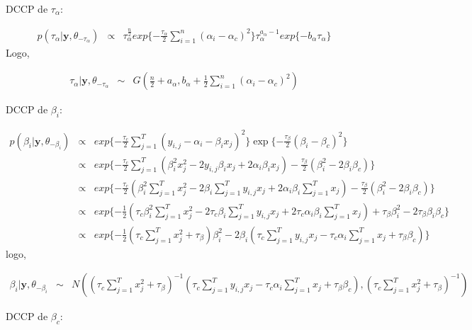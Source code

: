 \documentclass[12pt,a4paper,header]{abnt}
\def\bs{\boldsymbol}
\begin{document}
\ac{DCCP} de $\tau_\alpha$:

\begin{eqnarray}
p(\tau_\alpha | \bs{y}, \theta_{-\tau_\alpha} ) &\propto& \tau_\alpha^\frac{n}{2} exp\{ - \frac{\tau_\alpha}{2}  \sum^n_{i=1} (\alpha_{i} -\alpha_c)^2 \}  \tau_\alpha^{a_\alpha - 1} exp\{ -b_\alpha \tau_\alpha \}
\end{eqnarray}
Logo,

\begin{eqnarray}
\tau_\alpha | \bs{y}, \theta_{-\tau_\alpha}  &\sim& G(\frac{n}{2}+a_\alpha , b_\alpha + \frac{1}{2}\sum^n_{i=1} (\alpha_i -\alpha_c)^2 )
\end{eqnarray}

\ac{DCCP} de $\beta_i$:

\begin{eqnarray}
p(\beta_i | \bs{y}, \theta_{-\beta_i}) &\propto& exp\{ -\frac{\tau_c}{2} \sum^T_{j=1} (y_{i,j} -\alpha_i-  \beta_ix_j)^2  \} \exp\{ - \frac{\tau_\beta}{2} (\beta_i-\beta_c)^2 \}
\\
%
&\propto& exp\{ -\frac{\tau_c}{2} \sum^T_{j=1} (\beta_i^2 x_j^2 - 2 y_{i,j}\beta_ix_j + 2\alpha_i \beta_i x_j) - \frac{\tau_\beta}{2} (\beta_i^2-2\beta_i\beta_c) \} \\
%
&\propto& exp\{ -\frac{\tau_c}{2}  (\beta_i^2 \sum^T_{j=1} x_j^2 - 2\beta_i\sum^T_{j=1}y_{i,j}x_j + 2\alpha_i \beta_i \sum^T_{j=1} x_j) - \frac{\tau_\beta}{2} (\beta_i^2-2\beta_i\beta_c) \} \\
%
&\propto& exp\{ -\frac{1}{2}  (\tau_c\beta_i^2 \sum^T_{j=1} x_j^2 - 2\tau_c\beta_i\sum^T_{j=1}y_{i,j}x_j + 2\tau_c\alpha_i \beta_i \sum^T_{j=1} x_j) +  \tau_\beta\beta_i^2-2\tau_\beta\beta_i\beta_c \} \\
%
&\propto& exp\{ -\frac{1}{2}  (\tau_c \sum^T_{j=1} x_j^2 + \tau_\beta)\beta_i^2 - 2\beta_i(\tau_c\sum^T_{j=1}y_{i,j}x_j - \tau_c\alpha_i \sum^T_{j=1} x_j + \tau_\beta\beta_c)  \}
\end{eqnarray}
logo,

\begin{eqnarray}
\beta_i | \bs{y}, \theta_{-\beta_i}  &\sim& N((\tau_c \sum^T_{j=1} x_j^2 + \tau_\beta)^{-1} (\tau_c\sum^T_{j=1}y_{i,j}x_j - \tau_c\alpha_i \sum^T_{j=1} x_j + \tau_\beta\beta_c) , (\tau_c \sum^T_{j=1} x_j^2 + \tau_\beta)^{-1}  )
\end{eqnarray}

\ac{DCCP} de $\beta_c$:
\end{document}
